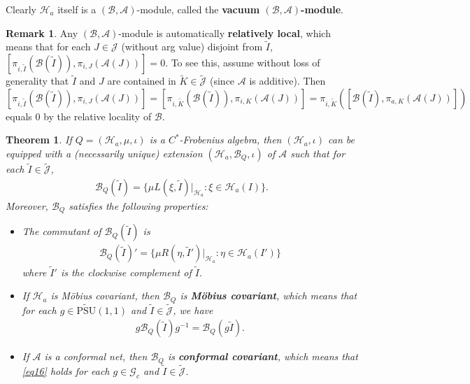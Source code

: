 \documentclass[12pt,a4paper,notitlepage]{article}
\theoremstyle{definition}
\newtheorem{rem}[df]{Remark}
\theoremstyle{plain}
\newtheorem{thm}[df]{Theorem}
\newcommand{\mc}{\mathcal}
\newcommand{\wtd}{\widetilde}
\newcommand{\Jtd}{\widetilde{\mathcal J}}
\newcommand{\UPSU}{\widetilde{\mathrm{PSU}}(1,1)}
\newcommand{\Gc}{\mathscr G_c}
\numberwithin{equation}{section}
\begin{document}
Clearly $\mc H_a$ itself is a $(\mc B,\mc A)$-module, called the \textbf{vacuum $(\mc B,\mc A)$-module}.
	
	

\begin{rem}\label{lb17}
Any $(\mc B,\mc A)$-module is automatically \textbf{relatively local}, which means that for each $J\in\mc J$ (without arg value) disjoint from $\wtd I$, $[\pi_{i,\wtd I}(\mc B(\wtd I)),\pi_{i,J}(\mc A(J))]=0$. To see this, assume without loss of generality that $\wtd I$ and $J$ are contained in $\wtd K\in\Jtd$ (since $\mc A$ is additive). Then $[\pi_{i,\wtd I}(\mc B(\wtd I)),\pi_{i,J}(\mc A(J))]=[\pi_{i,\wtd K}(\mc B(\wtd I)),\pi_{i,K}(\mc A(J))]=\pi_{i,\wtd K}([\mc B(\wtd I),\pi_{a,K}(\mc A(J))])$ equals $0$ by the relative locality of $\mc B$.
\end{rem}


\begin{thm}\label{lb5}
If $Q=(\mc H_a,\mu,\iota)$ is a $C^*$-Frobenius algebra, then $(\mc H_a,\iota)$ can be equipped with a (necessarily unique)  extension $(\mc H_a,\mc B_Q,\iota)$ of $\mc A$ such that for each $\wtd I\in\Jtd$,
\begin{align}
\mc B_Q(\wtd I)=\{\mu L(\xi,\wtd I)|_{\mc H_a}:\xi\in\mc H_a(I)\}.	\label{eq28}
\end{align}
Moreover, $\mc B_Q$ satisfies the following properties:
\begin{itemize}
\item The commutant of $\mc B_Q(\wtd I)$ is
\begin{align}
\mc B_Q(\wtd I)'=\{\mu R(\eta,\wtd I')|_{\mc H_a}:\eta\in\mc H_a(I')\}\label{eq20}	
\end{align}
where $\wtd I'$ is the clockwise complement of $\wtd I$.
\item If $\mc H_a$ is M\"obius covariant, then $\mc B_Q$ is \textbf{M\"obius covariant}, which means that for each $g\in\UPSU$ and $\wtd I\in\Jtd$, we have
\begin{align}
g\mc B_Q(\wtd I)g^{-1}=\mc B_Q(g\wtd I).\label{eq16}	
\end{align} 
\item If $\mc A$ is a conformal net, then $\mc B_Q$ is \textbf{conformal covariant}, which means that \eqref{eq16} holds for each $g\in\Gc$ and $\wtd I\in\Jtd$.
\end{itemize}
\end{thm}
\end{document}
